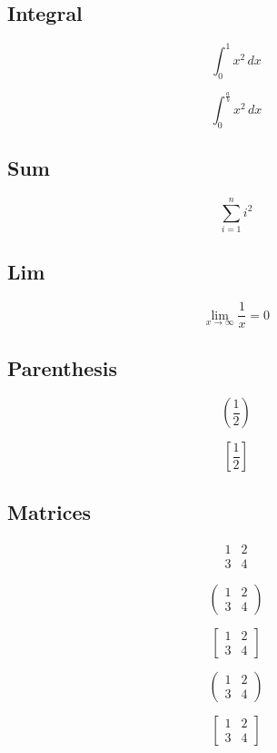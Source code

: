 \documentclass{article}
\begin{document}
\subsection{Integral}

\[
    \int_0^1 x^2 \, dx
\]

\[
    \int_{0}^{\frac{a}{b}} x^2 \, dx
\]

\subsection{Sum}

\[
    \sum_{i=1}^{n} i^2
\]

\subsection{Lim}

\[
    \lim_{x \to \infty} \frac{1}{x} = 0
\]

\subsection{Parenthesis}

\[
    \left( \frac{1}{2} \right)
\]

\[
    \left[ \frac{1}{2} \right]
\]

\subsection{Matrices}

\[
\begin{matrix}
    1 & 2 \\
    3 & 4
\end{matrix}
\]

\[
\begin{pmatrix}
    1 & 2 \\
    3 & 4
\end{pmatrix}
\]

\[
\begin{bmatrix}
    1 & 2 \\
    3 & 4
\end{bmatrix}
\]

\[
\left(
\begin{matrix}
    1 & 2 \\
    3 & 4
\end{matrix}
\right)
\]

\[
\left[
\begin{matrix}
    1 & 2 \\
    3 & 4
\end{matrix}
\right]
\]
 
\end{document}
